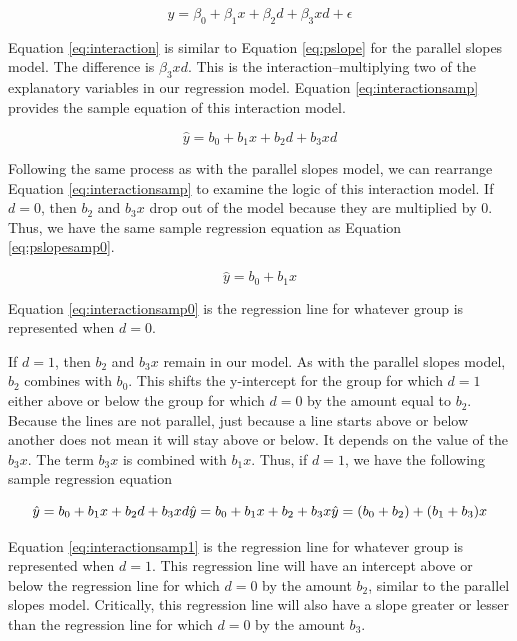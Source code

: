 \documentclass[
]{book}
\begin{document}
\begin{equation}
y = \beta_0 + \beta_1x + \beta_2d + \beta_3xd + \epsilon
\label{eq:interaction}
\end{equation}

Equation \eqref{eq:interaction} is similar to Equation \eqref{eq:pslope} for the parallel slopes model. The difference is \(\beta_3xd\). This is the interaction--multiplying two of the explanatory variables in our regression model. Equation \eqref{eq:interactionsamp} provides the sample equation of this interaction model.

\begin{equation}
\hat{y} = b_0 + b_1x + b_2d + b_3xd
\label{eq:interactionsamp}
\end{equation}

Following the same process as with the parallel slopes model, we can rearrange Equation \eqref{eq:interactionsamp} to examine the logic of this interaction model. If \(d=0\), then \(b_2\) and \(b_3x\) drop out of the model because they are multiplied by 0. Thus, we have the same sample regression equation as Equation \eqref{eq:pslopesamp0}.

\begin{equation}
\hat{y} = b_0 + b_1x
\label{eq:interactionsamp0}
\end{equation}

Equation \eqref{eq:interactionsamp0} is the regression line for whatever group is represented when \(d=0\).

If \(d=1\), then \(b_2\) and \(b_3x\) remain in our model. As with the parallel slopes model, \(b_2\) combines with \(b_0\). This shifts the y-intercept for the group for which \(d=1\) either above or below the group for which \(d=0\) by the amount equal to \(b_2\). Because the lines are not parallel, just because a line starts above or below another does not mean it will stay above or below. It depends on the value of the \(b_3x\). The term \(b_3x\) is combined with \(b_1x\). Thus, if \(d=1\), we have the following sample regression equation

\begin{equation}
\hat{y} = b_0 + b_1x + b_2d + b_3xd\\
\hat{y} = b_0 + b_1x + b_2 + b_3x\\
\hat{y} = (b_0 + b_2) + (b_1 + b_3)x
\label{eq:interactionsamp1}
\end{equation}

Equation \eqref{eq:interactionsamp1} is the regression line for whatever group is represented when \(d=1\). This regression line will have an intercept above or below the regression line for which \(d=0\) by the amount \(b_2\), similar to the parallel slopes model. Critically, this regression line will also have a slope greater or lesser than the regression line for which \(d=0\) by the amount \(b_3\).
\end{document}
